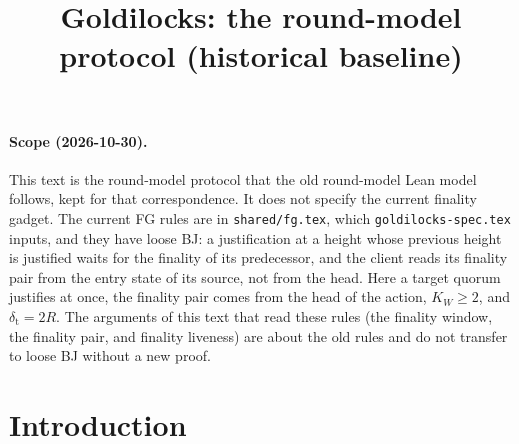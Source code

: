 \documentclass{article}
\title{Goldilocks: the round-model protocol (historical baseline)}
\author{}
\date{}
\theoremstyle{plain}
\theoremstyle{definition}
\theoremstyle{remark}
\begin{document}
\maketitle

\paragraph{Scope (2026-10-30).}  This text is the round-model protocol
that the old round-model Lean model follows, kept for that correspondence.  It does
not specify the current finality gadget.  The current FG rules are in
\texttt{shared/fg.tex}, which \texttt{goldilocks-spec.tex} inputs, and they
have loose BJ: a justification at
a height whose previous height is justified waits for the finality of its predecessor, and the client
reads its finality pair from the entry state of its source, not from the
head.  Here a target quorum justifies at once, the finality pair comes
from the head of the action, $K_W\geq2$, and $\delta_{\mathrm t}=2R$.  The
arguments of this text that read these rules (the finality window, the
finality pair, and finality liveness) are about the old rules and do not
transfer to loose BJ without a new proof.

\section{Introduction}\label{sec:intro}
\end{document}
